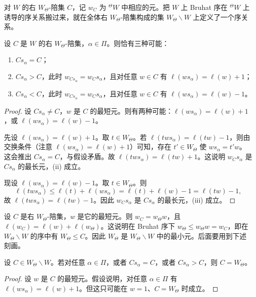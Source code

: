 对 $W$ 的右 $W_\Theta$-陪集 $C$，记 $w_C$ 为 ${}^{\Theta}W$ 中相应的元。把 $W$ 上 Bruhat 序在 ${}^{\Theta}W$ 上诱导的序关系搬过来，就在全体右 $W_\Theta$-陪集构成的集 $W_\Theta\backslash W$ 上定义了一个序关系。

\begin{proposition}\label{prop:06.1.6}
设 $C$ 是 $W$ 的右 $W_\Theta$-陪集，$\alpha\in\Pi$。则恰有三种可能：
\begin{enumerate}[label=(\roman*)]
\item $Cs_\alpha=C$；
\item $Cs_\alpha>C$，此时 $w_{Cs_\alpha}=w_Cs_\alpha$，且对任意 $w\in C$ 有 $\ell(ws_\alpha)=\ell(w)+1$；
\item $Cs_\alpha<C$，此时 $w_{Cs_\alpha}=w_Cs_\alpha$，且对任意 $w\in C$ 有 $\ell(ws_\alpha)=\ell(w)-1$。
\end{enumerate}
\end{proposition}

\begin{proof}
设 $Cs_\alpha\neq C$，$w$ 是 $C$ 的最短元。则有两种可能：$\ell(ws_\alpha)=\ell(w)+1$，或 $\ell(ws_\alpha)=\ell(w)-1$。

先设 $\ell(ws_\alpha)=\ell(w)+1$。取 $t\in W_\Theta$。若 $\ell(tws_\alpha)=\ell(tw)-1$，则由交换条件（注意 $\ell(ws_\alpha)=\ell(w)+1$）可知，存在 $t'\in W_\Theta$ 使 $ws_\alpha=t'w$。这会推出 $Cs_\alpha=C$，与假设矛盾。故 $\ell(tws_\alpha)=\ell(tw)+1$。这说明 $w_Cs_\alpha$ 是 $Cs_\alpha$ 的最长元，(ii) 成立。

现设 $\ell(ws_\alpha)=\ell(w)-1$。取 $t\in W_\Theta$。则
$$\ell(tws_\alpha)\le\ell(t)+\ell(ws_\alpha)=\ell(t)+\ell(w)-1=\ell(tw)-1,$$
故 $\ell(tws_\alpha)=\ell(tw)-1$。因此 $w_Cs_\alpha$ 是 $Cs_\alpha$ 的最长元，(iii) 成立。
\end{proof}

设 $C$ 是右 $W_\Theta$-陪集，$w$ 是它的最短元。则 $w_C=w_\Theta w$，且 $\ell(w_C)=\ell(w)+\ell(w_\Theta)$。这说明在 Bruhat 序下 $w_\Theta\le w_\Theta w=w_C$，即在 $W_\Theta\backslash W$ 的序中有 $W_\Theta\le C$。因此 $W_\Theta$ 是 $W_\Theta\backslash W$ 中的最小元。后面要用到下述刻画。

\begin{lemma}\label{lem:06.1.7}
设 $C\in W_\Theta\backslash W$。若对任意 $\alpha\in\Pi$，或者 $Cs_\alpha=C$，或者 $Cs_\alpha>C$，则 $C=W_\Theta$。
\end{lemma}

\begin{proof}
设 $w$ 是 $C$ 的最短元。假设说明，对任意 $\alpha\in\Pi$ 有 $\ell(ws_\alpha)=\ell(w)+1$。但这只可能在 $w=1$、$C=W_\Theta$ 时成立。
\end{proof}

